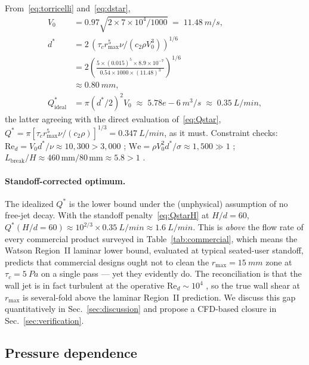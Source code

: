 \documentclass[10pt,letterpaper]{article}
\newcommand{\Rey}{\mathrm{Re}}
\newcommand{\We}{\mathrm{We}}
\begin{document}
From~\eqref{eq:torricelli} and~\eqref{eq:dstar},
\begin{align}
  V_0 &= 0.97\sqrt{2 \times 7\times 10^4/1000} \;=\; 11.48~m/s,\\
  d^* &= 2\,(\tau_c r_\mathrm{max}^5 \nu/(c_2\rho V_0^3))^{1/6}\nonumber\\
      &= 2\left(\frac{5 \times (0.015)^5 \times 8.9\times 10^{-7}}
              {0.54 \times 1000 \times (11.48)^3}\right)^{1/6}\nonumber\\
      &\approx 0.80~mm,\\
  Q^*_\mathrm{ideal} &= \pi (d^*/2)^2 V_0
                     \;\approx\; 5.78e-6~m^3/s
                     \;\approx\; 0.35~L/min,
\end{align}
the latter agreeing with the direct evaluation of~\eqref{eq:Qstar},
$Q^* = \pi[\tau_c r_\mathrm{max}^5\nu/(c_2\rho)]^{1/3}
 = 0.347~L/min$, as it must.
Constraint checks: $\Rey_d = V_0 d^*/\nu \approx 10{,}300 > 3{,}000$
\checkmark; $\We = \rho V_0^2 d^*/\sigma \approx 1{,}500 \gg 1$ \checkmark;
$L_\mathrm{break}/H \approx 460\,\mathrm{mm}/80\,\mathrm{mm} \approx 5.8 > 1$
\checkmark.

\paragraph{Standoff-corrected optimum.}
The idealized $Q^*$ is the lower bound under the (unphysical)
assumption of no free-jet decay. With the standoff
penalty~\eqref{eq:QstarH} at $H/d = 60$,
$Q^*(H/d{=}60) \approx 10^{2/3} \times 0.35~L/min
 \approx 1.6~L/min$.
This is \emph{above} the flow rate of every commercial product
surveyed in Table~\ref{tab:commercial}, which means the Watson
Region~II laminar lower bound, evaluated at typical seated-user
standoff, predicts that commercial designs ought not to clean the
$r_\mathrm{max} = 15~mm$ zone at $\tau_c = 5~Pa$ on a
single pass --- yet they evidently do. The reconciliation is that the
wall jet is in fact turbulent at the operative $\Rey_d \sim 10^4$
\citep{Phares2000}, so the true wall shear at $r_\mathrm{max}$ is
several-fold above the laminar Region~II prediction. We discuss this
gap quantitatively in Sec.~\ref{sec:discussion} and propose a CFD-based
closure in Sec.~\ref{sec:verification}.

\subsection{Pressure dependence}
\end{document}
